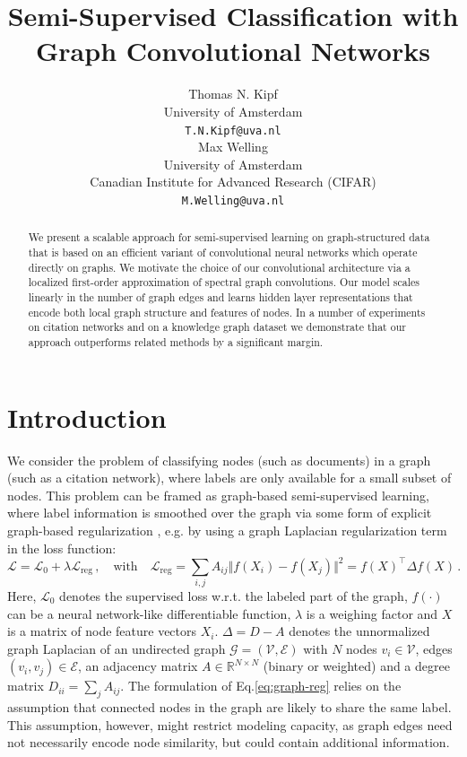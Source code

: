 \documentclass{article} %
\title{Semi-Supervised Classification with \\Graph Convolutional Networks}
\author{Thomas N. Kipf\\
University of Amsterdam \\
\texttt{T.N.Kipf@uva.nl} \\
\And
Max Welling\\
University of Amsterdam \\
Canadian Institute for Advanced Research (CIFAR)\\
\texttt{M.Welling@uva.nl} \\
}
\makeatletter
\newcommand*{\eg}{e.g.\@\xspace}
\newcommand*{\wrt}{w.r.t.\@\xspace}
\newcommand*{\eq}{Eq.\@\xspace}
\makeatother
\begin{document}
\maketitle

\begin{abstract}
We present a scalable approach for semi-supervised learning on graph-structured data that is based on an efficient variant of convolutional neural networks which operate directly on graphs. We motivate the choice of our convolutional architecture via a localized first-order approximation of spectral graph convolutions. Our model scales linearly in the number of graph edges and learns hidden layer representations that encode both local graph structure and features of nodes. In a number of experiments on citation networks and on a knowledge graph dataset we demonstrate that our approach outperforms related methods by a significant margin.
\end{abstract}

\section{Introduction}
We consider the problem of classifying nodes (such as documents) in a graph (such as a citation network), where labels are only available for a small subset of nodes. This problem can be framed as graph-based semi-supervised learning, where label information is smoothed over the graph via some form of explicit graph-based regularization \citep{zhu2003semi, zhou2004learning, belkin2006manifold, weston2012deep}, \eg by using a graph Laplacian regularization term in the loss function:
\begin{equation}
  \mathcal{L} = \mathcal{L}_0 + \lambda \mathcal{L}_{\text{reg}}\, , \quad \text{with} \quad \mathcal{L}_{\text{reg}}= \sum_{i,j}A_{ij}\Vert f(X_i)-f(X_j) \Vert ^2 = f(X)^\top \Delta f(X) \, .
\label{eq:graph-reg}
\end{equation}
Here, $\mathcal{L}_0$ denotes the supervised loss \wrt the labeled part of the graph, $f(\cdot)$ can be a neural network-like differentiable function, $\lambda$ is a weighing factor and $X$ is a matrix of node feature vectors $X_i$. $\Delta = D - A$ denotes the unnormalized graph Laplacian of an undirected graph $\mathcal{G}=(\mathcal{V}, \mathcal{E})$ with $N$ nodes $v_i \in \mathcal{V}$, edges $(v_i, v_j)\in\mathcal{E}$, an adjacency matrix $A\in\mathbb{R}^{N\times N}$ (binary or weighted) and a degree matrix $D_{ii} = \sum_j A_{ij}$. The formulation of \eq \ref{eq:graph-reg} relies on the assumption that connected nodes in the graph are likely to share the same label. This assumption, however, might restrict modeling capacity, as graph edges need not necessarily encode node similarity, but could contain additional information.
\end{document}
